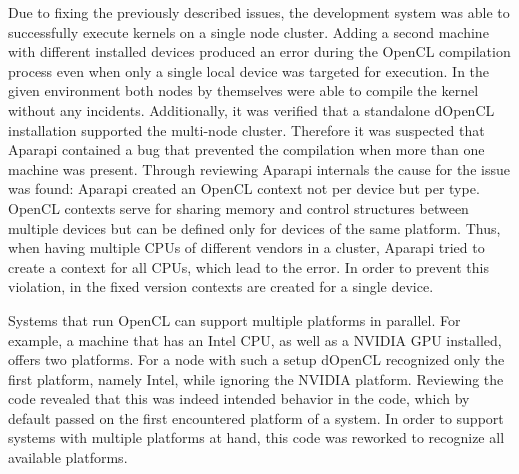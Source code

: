 \begin{description}[style=nextline]
	\item [Failed compilations when using multiple devices]
	Due to fixing the previously described issues, the development system was able to successfully execute kernels on a single node cluster. Adding a second machine with different installed devices produced an error during the OpenCL compilation process even when only a single local device was targeted for execution. In the given environment both nodes by themselves were able to compile the kernel without any incidents. Additionally, it was verified that a standalone dOpenCL installation supported the multi-node cluster. Therefore it was suspected that Aparapi contained a bug that prevented the compilation when more than one machine was present. Through reviewing Aparapi internals the cause for the issue was found: Aparapi created an OpenCL context not per device but per type. OpenCL contexts serve for sharing memory and control structures between multiple devices but can be defined only for devices of the same platform. Thus, when having multiple CPUs of different vendors in a cluster, Aparapi tried to create a context for all CPUs, which lead to the error. In order to prevent this violation, in the fixed version contexts are created for a single device.

	\item [Multiple platforms per machine]
	Systems that run OpenCL can support multiple platforms in parallel. For example, a machine that has an Intel CPU, as well as a NVIDIA GPU installed, offers two platforms. For a node with such a setup dOpenCL recognized only the first platform, namely Intel, while ignoring the NVIDIA platform. Reviewing the code revealed that this was indeed intended behavior in the code, which by default passed on the first encountered platform of a system. In order to support systems with multiple platforms at hand, this code was reworked to recognize all available platforms.

\end{description}


